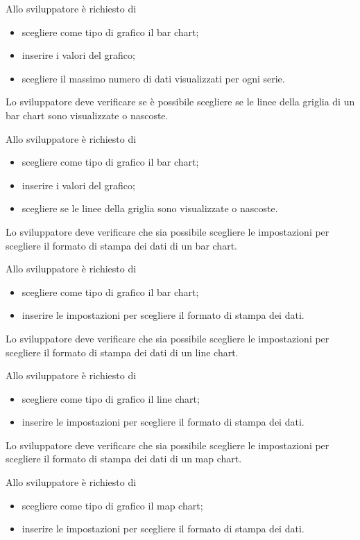 		Allo sviluppatore è richiesto di
		\begin{itemize}
			\item scegliere come tipo di grafico il bar chart;
			\item inserire i valori del grafico;
			\item scegliere il massimo numero di dati visualizzati per ogni serie.
		\end{itemize}

	Lo sviluppatore deve verificare se è possibile scegliere se le linee della griglia di un bar chart sono visualizzate o nascoste.

		Allo sviluppatore è richiesto di
		\begin{itemize}
			\item scegliere come tipo di grafico il bar chart;
			\item inserire i valori del grafico;
			\item scegliere se le linee della griglia sono visualizzate o nascoste.
		\end{itemize}

	Lo sviluppatore deve verificare che sia possibile scegliere le impostazioni per scegliere il formato di stampa dei dati di un bar chart.

		Allo sviluppatore è richiesto di
		\begin{itemize}
			\item scegliere come tipo di grafico il bar chart;
			\item inserire le impostazioni per scegliere il formato di stampa dei dati.
		\end{itemize}

	Lo sviluppatore deve verificare che sia possibile scegliere le impostazioni per scegliere il formato di stampa dei dati di un line chart.

		Allo sviluppatore è richiesto di
		\begin{itemize}
			\item scegliere come tipo di grafico il line chart;
			\item inserire le impostazioni per scegliere il formato di stampa dei dati.
		\end{itemize}

	Lo sviluppatore deve verificare che sia possibile scegliere le impostazioni per scegliere il formato di stampa dei dati di un map chart.

		Allo sviluppatore è richiesto di
		\begin{itemize}
			\item scegliere come tipo di grafico il map chart;
			\item inserire le impostazioni per scegliere il formato di stampa dei dati.
		\end{itemize}

